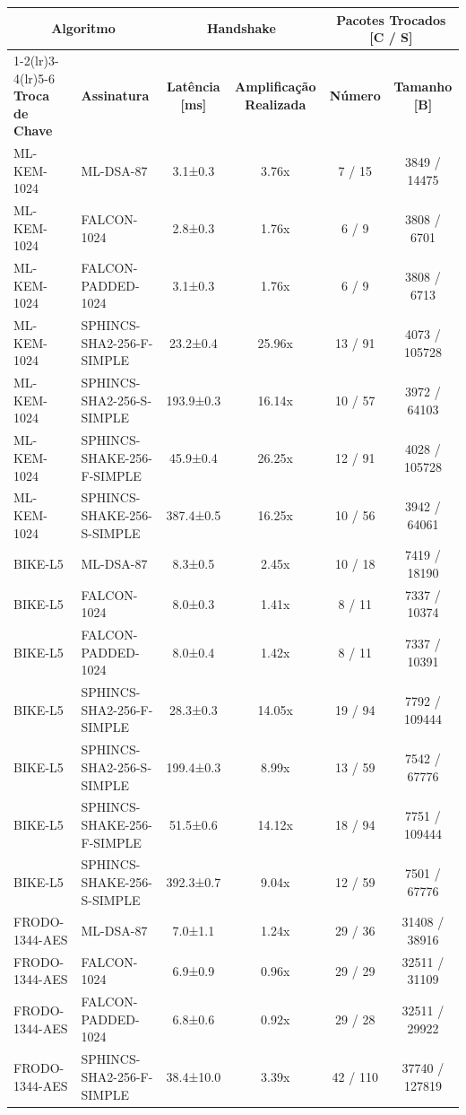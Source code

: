 \documentclass[10pt]{article}
\begin{document}
\centering
\small
\begin{tabular}{@{}l l c c c c@{}}
\toprule
\multicolumn{2}{c}{\textbf{Algoritmo}} & \multicolumn{2}{c}{\textbf{Handshake}} & \multicolumn{2}{c}{\textbf{Pacotes Trocados [C / S]}} \\
\cmidrule(lr){1-2}\cmidrule(lr){3-4}\cmidrule(lr){5-6}
\textbf{Troca de Chave} & \textbf{Assinatura} & \textbf{Latência [ms]} & \textbf{Amplificação Realizada} & \textbf{Número} & \textbf{Tamanho [B]} \\
\midrule
ML-KEM-1024 & ML-DSA-87 & 3.1±0.3 & 3.76x & 7 / 15 & 3849 / 14475 \\
ML-KEM-1024 & FALCON-1024 & 2.8±0.3 & 1.76x & 6 / 9 & 3808 / 6701 \\
ML-KEM-1024 & FALCON-PADDED-1024 & 3.1±0.3 & 1.76x & 6 / 9 & 3808 / 6713 \\
ML-KEM-1024 & SPHINCS-SHA2-256-F-SIMPLE & 23.2±0.4 & 25.96x & 13 / 91 & 4073 / 105728 \\
ML-KEM-1024 & SPHINCS-SHA2-256-S-SIMPLE & 193.9±0.3 & 16.14x & 10 / 57 & 3972 / 64103 \\
ML-KEM-1024 & SPHINCS-SHAKE-256-F-SIMPLE & 45.9±0.4 & 26.25x & 12 / 91 & 4028 / 105728 \\
ML-KEM-1024 & SPHINCS-SHAKE-256-S-SIMPLE & 387.4±0.5 & 16.25x & 10 / 56 & 3942 / 64061 \\
BIKE-L5 & ML-DSA-87 & 8.3±0.5 & 2.45x & 10 / 18 & 7419 / 18190 \\
BIKE-L5 & FALCON-1024 & 8.0±0.3 & 1.41x & 8 / 11 & 7337 / 10374 \\
BIKE-L5 & FALCON-PADDED-1024 & 8.0±0.4 & 1.42x & 8 / 11 & 7337 / 10391 \\
BIKE-L5 & SPHINCS-SHA2-256-F-SIMPLE & 28.3±0.3 & 14.05x & 19 / 94 & 7792 / 109444 \\
BIKE-L5 & SPHINCS-SHA2-256-S-SIMPLE & 199.4±0.3 & 8.99x & 13 / 59 & 7542 / 67776 \\
BIKE-L5 & SPHINCS-SHAKE-256-F-SIMPLE & 51.5±0.6 & 14.12x & 18 / 94 & 7751 / 109444 \\
BIKE-L5 & SPHINCS-SHAKE-256-S-SIMPLE & 392.3±0.7 & 9.04x & 12 / 59 & 7501 / 67776 \\
FRODO-1344-AES & ML-DSA-87 & 7.0±1.1 & 1.24x & 29 / 36 & 31408 / 38916 \\
FRODO-1344-AES & FALCON-1024 & 6.9±0.9 & 0.96x & 29 / 29 & 32511 / 31109 \\
FRODO-1344-AES & FALCON-PADDED-1024 & 6.8±0.6 & 0.92x & 29 / 28 & 32511 / 29922 \\
FRODO-1344-AES & SPHINCS-SHA2-256-F-SIMPLE & 38.4±10.0 & 3.39x & 42 / 110 & 37740 / 127819 \\

\end{tabular}
\end{document}
